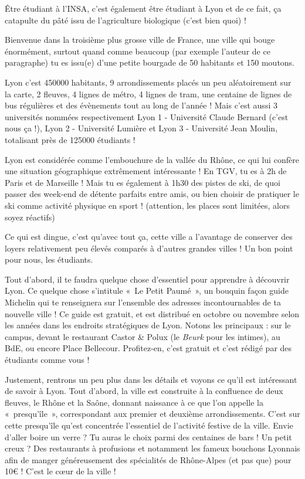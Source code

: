 Être étudiant à l'INSA, c'est également être étudiant à Lyon et de ce fait, ça
catapulte du pâté issu de l'agriculture biologique (c'est bien quoi) !

Bienvenue dans la troisième plus grosse ville de France, une ville
qui bouge énormément, surtout quand comme beaucoup (par exemple l'auteur de ce
paragraphe) tu es issu(e) d'une petite bourgade de 50 habitants et 150 moutons.

Lyon c'est 450000 habitants, 9 arrondissements placés un peu aléatoirement sur
la carte, 2 fleuves, 4 lignes de métro, 4 lignes de tram, une centaine de lignes
de bus régulières et des évènements tout au long de l'année ! Mais c'est aussi 3
universités nommées respectivement Lyon 1 - Université Claude Bernard (c'est
nous ça !), Lyon 2 - Université Lumière et Lyon 3 - Université Jean
Moulin, totalisant près de 125000 étudiants !

Lyon est considérée comme l'embouchure de la vallée du Rhône, ce qui lui confère
une situation géographique extrêmement intéressante ! En TGV, tu es
à 2h de Paris et de Marseille ! Mais tu es également à 1h30 des pistes de ski,
de quoi passer des week-end de détente parfaits entre amis, ou bien choisir de
pratiquer le ski comme activité physique en sport ! (attention, les places sont limitées, alors soyez réactifs)

Ce qui est dingue, c'est qu'avec tout ça, cette ville a l'avantage de conserver
des loyers relativement peu élevés comparés à d'autres grandes villes ! Un bon point pour nous, les étudiants.

Tout d'abord, il te faudra quelque chose d'essentiel pour apprendre à découvrir
Lyon. Ce quelque chose s'intitule «~Le Petit Paumé~», un bouquin façon guide
Michelin qui te renseignera sur l'ensemble des adresses incontournables de ta
nouvelle ville ! Ce guide est gratuit, et est distribué en octobre ou novembre
selon les années dans les endroits stratégiques de Lyon. Notons les
principaux : sur le campus, devant le restaurant Castor \& Polux (le \emph{Beurk} pour les
intimes), au BdE, ou encore Place Bellecour. Profitez-en, c'est gratuit
et c'est rédigé par des étudiants comme vous !

Justement, rentrons un peu plus dans les détails et voyons ce qu'il est
intéressant de savoir à Lyon. Tout d'abord, la ville est construite à la
confluence de deux fleuves, le Rhône et la Saône, donnant naissance à ce que
l'on appelle la «~presqu'île~», correspondant aux premier et deuxième arrondissements.
C'est sur cette presqu'île qu'est concentrée l'essentiel de l'activité festive
de la ville. Envie d'aller boire un verre ? Tu auras le choix parmi des
centaines de bars ! Un petit creux ? Des restaurants à profusions et notamment
les fameux bouchons Lyonnais afin de manger généreusement des spécialités de
Rhône-Alpes (et pas que) pour 10€ ! C'est le cœur de la ville !

